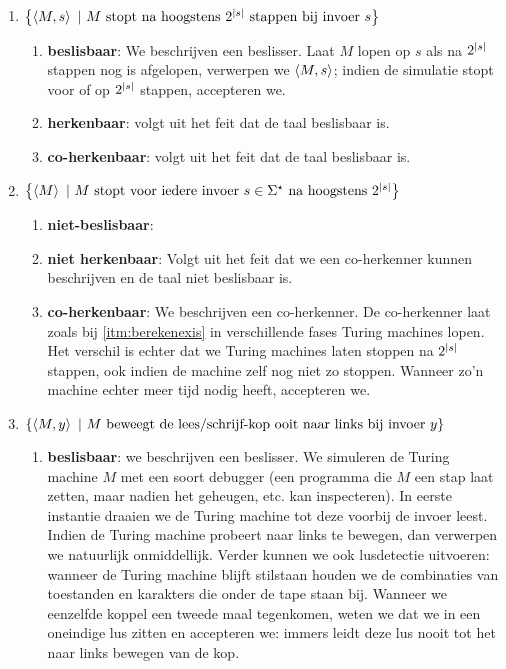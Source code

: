 \documentclass{article}
\begin{document}
\begin{question}[Berekenbaarheid]
\begin{answer}
\begin{enumerate}
\begin{enumerate}
 \end{enumerate}
 \item $\left\{ \left\langle M,s \right\rangle\ |\ \mbox{$M$ stopt na hoogstens $2^{\left|s\right|}$ stappen bij invoer $s$} \right\}$
 \begin{enumerate}
  \item \textbf{beslisbaar}: We beschrijven een beslisser. Laat $M$ lopen op $s$ als na $2^{\left|s\right|}$ stappen nog is afgelopen, verwerpen we $\left\langle M,s \right\rangle$; indien de simulatie stopt voor of op $2^{\left|s\right|}$ stappen, accepteren we.
  \item \textbf{herkenbaar}: volgt uit het feit dat de taal beslisbaar is.
  \item \textbf{co-herkenbaar}: volgt uit het feit dat de taal beslisbaar is.
 \end{enumerate}
 \item $\left\{ \left\langle M \right\rangle\ |\ \mbox{$M$ stopt voor iedere invoer $s\in\Sigma^{\star}$ na hoogstens $2^{\left|s\right|}$} \right\}$
 \begin{enumerate}
  \item \textbf{niet-beslisbaar}: 
  \item \textbf{niet herkenbaar}: Volgt uit het feit dat we een co-herkenner kunnen beschrijven en de taal niet beslisbaar is.
  \item \textbf{co-herkenbaar}: We beschrijven een co-herkenner. De co-herkenner laat zoals bij \ref{itm:berekenexis} in verschillende fases Turing machines lopen. Het verschil is echter dat we Turing machines laten stoppen na $2^{\left|s\right|}$ stappen, ook indien de machine zelf nog niet zo stoppen. Wanneer zo'n machine echter meer tijd nodig heeft, accepteren we.
 \end{enumerate}
 \item $\left\{ \left\langle M,y \right\rangle\ |\ \mbox{$M$ beweegt de lees/schrijf-kop ooit naar links bij invoer $y$} \right\}$
 \begin{enumerate}
  \item \textbf{beslisbaar}: we beschrijven een beslisser. We simuleren de Turing machine $M$ met een soort debugger (een programma die $M$ een stap laat zetten, maar nadien het geheugen, etc. kan inspecteren). In eerste instantie draaien we de Turing machine tot deze voorbij de invoer leest. Indien de Turing machine probeert naar links te bewegen, dan verwerpen we natuurlijk onmiddellijk. Verder kunnen we ook lusdetectie uitvoeren: wanneer de Turing machine blijft stilstaan houden we de combinaties van toestanden en karakters die onder de tape staan bij. Wanneer we eenzelfde koppel een tweede maal tegenkomen, weten we dat we in een oneindige lus zitten en accepteren we: immers leidt deze lus nooit tot het naar links bewegen van de kop.

\end{enumerate}
\end{enumerate}
\end{answer}
\end{question}
\end{document}
